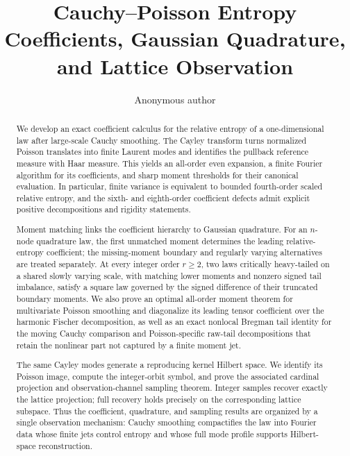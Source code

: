 \documentclass[11pt,reqno]{amsart}
\title[Cauchy--Poisson Coefficients and Sampling]{Cauchy--Poisson Entropy
Coefficients, Gaussian Quadrature, and Lattice Observation}
\author{Anonymous author}
\date{}
\theoremstyle{plain}
\theoremstyle{definition}
\numberwithin{equation}{section}
\begin{document}
\begin{abstract}
We develop an exact coefficient calculus for the relative entropy of a
one-dimensional law after large-scale Cauchy smoothing.  The Cayley transform
turns normalized Poisson translates into finite Laurent modes and identifies
the pullback reference measure with Haar measure.  This yields an all-order
even expansion, a finite Fourier algorithm for its coefficients, and sharp
moment thresholds for their canonical evaluation.  In particular, finite
variance is equivalent to bounded fourth-order scaled relative entropy, and
the sixth- and eighth-order coefficient defects admit explicit positive
decompositions and rigidity statements.

Moment matching links the coefficient hierarchy to Gaussian quadrature.  For
an \(n\)-node quadrature law, the first unmatched moment determines the
leading relative-entropy coefficient; the missing-moment boundary and
regularly varying alternatives are treated separately.  At every integer
order \(r\ge2\), two laws critically heavy-tailed on a shared slowly varying
scale, with matching lower moments and nonzero signed tail imbalance, satisfy
a square law governed by the signed difference of their truncated boundary
moments.  We also prove an
optimal all-order moment theorem for multivariate Poisson smoothing and
diagonalize its leading tensor coefficient over the harmonic Fischer
decomposition, as well as an exact nonlocal Bregman tail identity for the
moving Cauchy comparison and
Poisson-specific raw-tail decompositions that retain the nonlinear part not
captured by a finite moment jet.

The same Cayley modes generate a reproducing kernel Hilbert space.  We
identify its Poisson image, compute the integer-orbit symbol, and prove the
associated cardinal projection and observation-channel sampling theorem.
Integer samples recover exactly the lattice projection; full recovery holds
precisely on the corresponding lattice subspace.  Thus the coefficient,
quadrature, and sampling results are organized by a single observation
mechanism: Cauchy smoothing compactifies the law into Fourier data whose
finite jets control entropy and whose full mode profile supports Hilbert-space
reconstruction.
\end{abstract}
\maketitle


















\appendix



\end{document}
